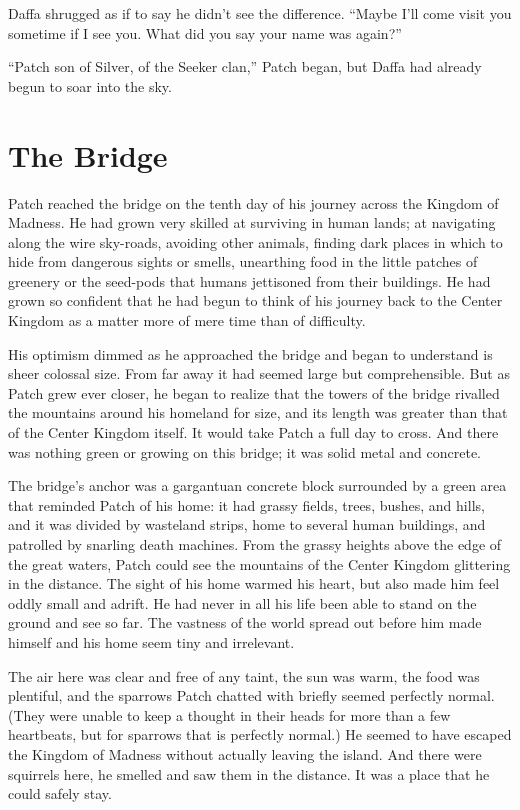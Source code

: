 \documentclass[12pt]{memoir}
\begin{document}
Daffa shrugged as if to say he didn’t see the difference. “Maybe I’ll
come visit you sometime if I see you. What did you say your name was
again?”

“Patch son of Silver, of the Seeker clan,” Patch began, but Daffa had
already begun to soar into the sky.


\section{The Bridge}

Patch reached the bridge on the tenth day of his journey across the
Kingdom of Madness. He had grown very skilled at surviving in human
lands; at navigating along the wire sky-roads, avoiding other animals,
finding dark places in which to hide from dangerous sights or smells,
unearthing food in the little patches of greenery or the seed-pods
that humans jettisoned from their buildings. He had grown so confident
that he had begun to think of his journey back to the Center Kingdom
as a matter more of mere time than of difficulty.

His optimism dimmed as he approached the bridge and began to
understand is sheer colossal size. From far away it had seemed large
but comprehensible. But as Patch grew ever closer, he began to realize
that the towers of the bridge rivalled the mountains around his
homeland for size, and its length was greater than that of the Center
Kingdom itself. It would take Patch a full day to cross. And there was
nothing green or growing on this bridge; it was solid metal and
concrete.

The bridge’s anchor was a gargantuan concrete block surrounded by a
green area that reminded Patch of his home: it had grassy fields,
trees, bushes, and hills, and it was divided by wasteland strips, home
to several human buildings, and patrolled by snarling death
machines. From the grassy heights above the edge of the great waters,
Patch could see the mountains of the Center Kingdom glittering in the
distance. The sight of his home warmed his heart, but also made him
feel oddly small and adrift. He had never in all his life been able to
stand on the ground and see so far. The vastness of the world spread
out before him made himself and his home seem tiny and irrelevant.

The air here was clear and free of any taint, the sun was warm, the
food was plentiful, and the sparrows Patch chatted with briefly seemed
perfectly normal. (They were unable to keep a thought in their heads
for more than a few heartbeats, but for sparrows that is perfectly
normal.) He seemed to have escaped the Kingdom of Madness without
actually leaving the island. And there were squirrels here, he smelled
and saw them in the distance. It was a place that he could safely
stay.
\end{document}
